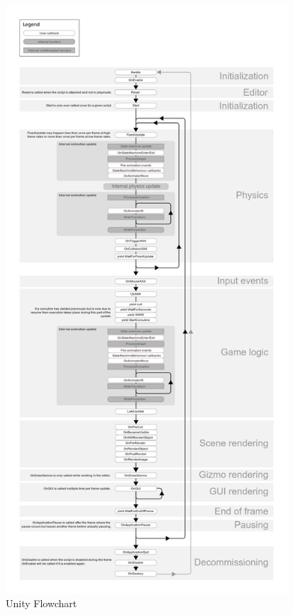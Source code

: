 \documentclass[12pt,twoside]{article}
\begin{document}
\begin{figure}[ht]
    \centering
    \includegraphics[width=10.5cm]{figures/UnityFlowchart.png}
    \caption{Unity Flowchart\cite{Unity:Flowchart}}
    \label{Unity:FlowchartFIG}
\end{figure}

\clearpage
\end{document}
